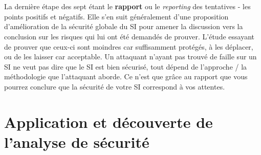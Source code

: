 \\ \\
La dernière étape des sept étant le \textbf{rapport} ou le \textit{reporting} des tentatives - les points positifs et négatifs. Elle s'en suit généralement d'une proposition d'amélioration de la sécurité globale du SI pour amener la discussion vers la conclusion sur les risques qui lui ont été demandés de prouver. L'étude essayant de prouver que ceux-ci sont moindres car suffisamment protégés, à les déplacer, ou de les laisser car acceptable. Un attaquant n'ayant pas trouvé de faille sur un SI ne veut pas dire que le SI est bien sécurisé, tout dépend de l'approche / la méthodologie que l'attaquant aborde. Ce n'est que grâce au rapport que vous pourrez conclure que la sécurité de votre SI correspond à vos attentes.

\section{Application et découverte de l'analyse de sécurité}

